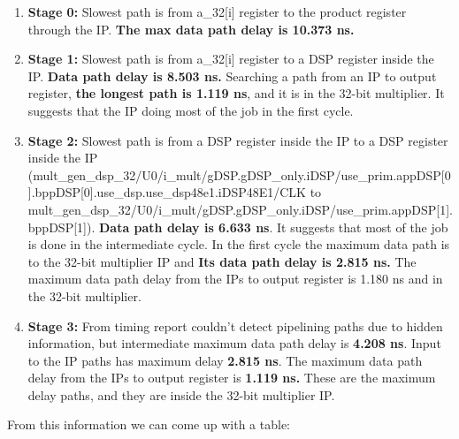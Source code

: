 \documentclass{report}
\begin{document}
\begin{enumerate}
    \item \textbf{Stage 0:} Slowest path is from a\_32[i] register to the product register through the IP. \textbf{The max data path delay is 10.373 ns.}
    \item \textbf{Stage 1:} Slowest path is from a\_32[i] register to a DSP register inside the IP. \textbf{Data path delay is 8.503 ns.} Searching a path from an IP to output register, \textbf{the longest path is 1.119 ns}, and it is in the 32-bit multiplier. It suggests that the IP doing most of the job in the first cycle.
    \item \textbf{Stage 2:} Slowest path is from a DSP  register inside the IP to a DSP  register inside the IP (mult\_gen\_dsp\_32/U0/i\_mult/gDSP.gDSP\_only.iDSP/use\_prim.appDSP[0].bppDSP[0].use\_dsp.use\_dsp48e1.iDSP48E1/CLK to mult\_gen\_dsp\_32/U0/i\_mult/gDSP.gDSP\_only.iDSP/use\_prim.appDSP[1].bppDSP[1]). \textbf{Data path delay is 6.633 ns}. It suggests that most of the job is done in the intermediate cycle. In the first cycle the maximum data path is to the 32-bit multiplier IP and \textbf{Its data path delay is 2.815 ns.} The maximum data path delay from the IPs to output register is 1.180 ns and in the 32-bit multiplier.
    \item \textbf{Stage 3:} From timing report couldn't detect pipelining paths due to hidden information, but intermediate maximum data path delay is \textbf{4.208 ns}. Input to the IP paths has maximum delay \textbf{2.815 ns}. The maximum data path delay from the IPs to output register is \textbf{1.119 ns.} These are the maximum delay paths, and they are inside the 32-bit multiplier IP.
\end{enumerate}

From this information we can come up with a table:
\pagebreak
\end{document}
